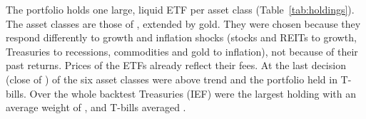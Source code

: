 The portfolio holds one large, liquid ETF per asset class (Table~\ref{tab:holdings}). The asset classes are those
of \citet{faber2007}, extended by gold. They were chosen because they respond differently to growth and inflation
shocks (stocks and REITs to growth, Treasuries to recessions, commodities and gold to inflation), not because of
their past returns. Prices of the ETFs already reflect their fees.
At the last decision (close of )  of the six asset classes were above trend and the portfolio held
 in T-bills. Over the whole backtest Treasuries (IEF) were the largest holding with an average weight of
, and T-bills averaged .


